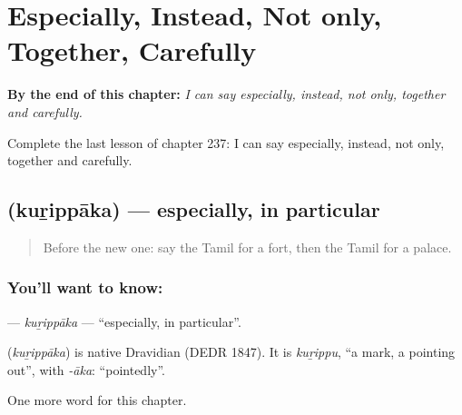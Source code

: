 
\chapter{Especially, Instead, Not only, Together, Carefully}
\label{ch:ta-especially-instead-not-only-together-carefully}

\begin{chapteropening}
\textbf{By the end of this chapter:} \emph{I can say especially, instead, not only, together and carefully.}

Complete the last lesson of chapter 237: I can say especially, instead, not only, together and carefully.
\end{chapteropening}

\section[\texorpdfstring{\ta{குறிப்பாக} (kuṟippāka)}{குறிப்பாக (kuṟippāka)}]{ (kuṟippāka) — especially, in particular}

\label{lesson:TA-C237-kurippaka}



\begin{quote}
Before the new one: say the Tamil for a fort, then the Tamil for a palace.
\end{quote}

\subsection*{You'll want to know: }
\textbf{} — \emph{kuṟippāka} — \textquotedblleft{}especially, in particular\textquotedblright{}.

\begin{cousinweb}
\textbf{} (\emph{kuṟippāka}) is native Dravidian (DEDR 1847). It is \emph{kuṟippu}, \textquotedblleft{}a mark, a pointing out\textquotedblright{}, with \emph{-āka}: \textquotedblleft{}pointedly\textquotedblright{}.
\end{cousinweb}

\begin{grammarlens}[title={What you've built}]
One more word for this chapter.
\end{grammarlens}

